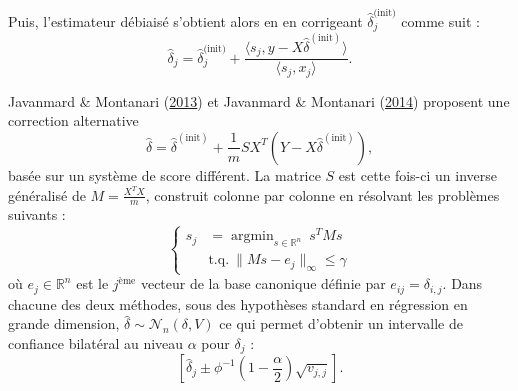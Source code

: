 \documentclass[12pt,a4paper]{reedthesis}
\newcommand \RR {\mathbb{R}}
\newcommand \shifts {\delta}
\DeclareMathOperator*{\argmin}{argmin}
\theoremstyle{definition}
\theoremstyle{definition}
\theoremstyle{definition}
\theoremstyle{remark}
\begin{document}
Puis, l'estimateur débiaisé s'obtient alors en en corrigeant \(\hat{\shifts}_j^{\text{(init)}}\) comme suit :
\begin{equation*}
\hat{\shifts}_j = \hat{\shifts}_j^{\text{(init)}} + \frac{\langle s_j,y-X\hat{\shifts}^{(\text{init})}\rangle}{\langle s_j,x_j\rangle}.
\end{equation*}
\newline

Javanmard \& Montanari (\protect\hyperlink{ref-javanmard2013confidence}{2013}) et Javanmard \& Montanari (\protect\hyperlink{ref-javanmard2014confidence}{2014}) proposent une correction alternative
\begin{equation*}
\hat{\shifts} = \hat{\shifts}^{(\text{init})} + \frac{1}{m}SX^T \left(Y-X\hat{\shifts}^{(\text{init})}\right),
\end{equation*}
basée sur un système de score différent. La matrice \(S\) est cette fois-ci un inverse généralisé de \(M = \frac{X^TX}{m}\), construit colonne par colonne en résolvant les problèmes suivants :
\begin{equation*}
\left\{
  \begin{aligned}
    s_j & = \argmin_{s \in \mathbb{R}^{n}} \ s^TMs \\
    &\text{t.q.}\  \|Ms - e_j\|_{\infty} \leq \gamma
  \end{aligned}
\right.
\end{equation*}
où \(e_j \in \RR^n\) est le \(j^{\text{ème}}\) vecteur de la base canonique définie par \(e_{ij} = \delta_{i,j}\). Dans chacune des deux méthodes, sous des hypothèses standard en régression en grande dimension, \(\hat{\shifts}\sim \mathcal{N}_n\left(\shifts,V\right)\) ce qui permet d'obtenir un intervalle de confiance bilatéral au niveau \(\alpha\) pour \(\shifts_j\) :
\begin{equation*}
\left[ \hat{\shifts}_j \pm \phi^{-1}\left(1-\frac{\alpha}{2}\right) \sqrt{v_{j,j}} \right].
\end{equation*}
\newline
\end{document}
